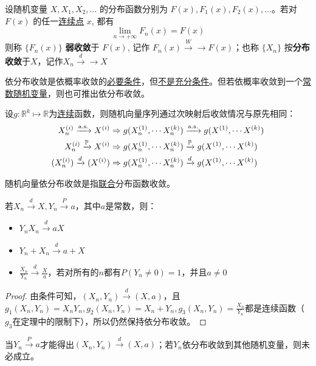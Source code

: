 \begin{definition}
    设随机变量 $ X, X_1,  X_2, \dotsc $  的分布函数分别为 $ F (x), F_1 (x), F_2 (x), \dotsc $。若对 $ F (x) $ 的任一\underline{连续点} $x$, 都有
    \[ \lim_{n \to +\infty} F_n (x) = F (x) \]
    则称 $ \{ F_n (x) \} $ \textbf{弱收敛}于 $ F (x) $, 记作    $F_n (x) \xrightarrow{W}{\to} F (x)$；也称 $ \{ X_n \} $ 按\textbf{分布收敛}于$X$，记作$X_n \xrightarrow{d}{\to} X$
\end{definition}

\begin{theorem}
    依分布收敛是依概率收敛的\underline{必要条件}，但\underline{不是充分条件}。但若依概率收敛到一个\underline{常数随机变量}，则也可推出依分布收敛。
\end{theorem}

\begin{theorem}[连续映射定理]
    设$g: \mathbb{R}^k \mapsto \mathbb{R}$为\underline{连续}函数，则随机向量序列通过次映射后收敛情况与原先相同：
    \begin{align*}
        X_n^{(i)} \xrightarrow{\mathrm{a.s.}} X^{(i)} &\Rightarrow g(X_n^{(1)},\cdots X_n^{(k)}) \xrightarrow{\mathrm{a.s.}} g(X^{(1)},\cdots X^{(k)})\\
        X_n^{(i)} \xrightarrow{\mathbb{P}} X^{(i)} &\Rightarrow g(X_n^{(1)},\cdots X_n^{(k)}) \xrightarrow{\mathbb{P}} g(X^{(1)},\cdots X^{(k)})\\
        (X_n^{(i)}) \xrightarrow{d} (X^{(i)}) &\Rightarrow g(X_n^{(1)},\cdots X_n^{(k)}) \xrightarrow{d} g(X^{(1)},\cdots X^{(k)})\\
    \end{align*}
\end{theorem}
\begin{remark}
    随机向量依分布收敛是指\underline{联合}分布函数收敛。
\end{remark}

\begin{theorem}[Slutsky定理]
    若$X_n \xrightarrow{d} X, Y_n \xrightarrow{P} a$，其中$a$是常数，则：
    \begin{itemize}
        \item $Y_n X_n \xrightarrow{d} a X$
        \item $Y_n + X_n \xrightarrow{d} a + X$
        \item $\frac{X_n}{Y_n}  \xrightarrow{d} \frac{X}{a}$，若对所有的$n$都有$P(Y_n\neq 0)=1$，并且$a\neq 0$
    \end{itemize}
\end{theorem}

\begin{proof}
    由条件可知，$(X_n,Y_n) \xrightarrow{d} (X,a)$，且$g_1(X_n,Y_n)=X_n Y_n, g_2(X_n,Y_n)=X_n+Y_n, g_3(X_n,Y_n)=\frac{X_n}{Y_n}$都是连续函数（$g_3$在定理中的限制下），所以仍然保持依分布收敛。
\end{proof}
\begin{remark}
    当$Y_n \xrightarrow{P} a$才能得出$(X_n,Y_n) \xrightarrow{d} (X,a)$；若$Y_n$依分布收敛到其他随机变量，则未必成立。
\end{remark}

